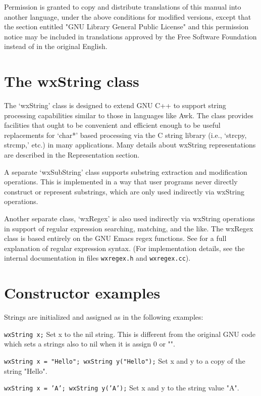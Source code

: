 Permission is granted to copy and distribute translations of this
manual into another language, under the above conditions for modified
versions, except that the section entitled "GNU Library General Public
License" and this permission notice may be included in translations
approved by the Free Software Foundation instead of in the original
English.


\section{The wxString class}

The `wxString' class is designed to extend GNU C++ to support string
processing capabilities similar to those in languages like Awk. The
class provides facilities that ought to be convenient and efficient
enough to be useful replacements for `char*' based processing via the C
string library (i.e., `strcpy, strcmp,' etc.) in many applications.
Many details about wxString representations are described in the
Representation section.

A separate `wxSubString' class supports substring extraction and
modification operations. This is implemented in a way that user
programs never directly construct or represent substrings, which are
only used indirectly via wxString operations.

Another separate class, `wxRegex' is also used indirectly via wxString
operations in support of regular expression searching, matching, and the
like.  The wxRegex class is based entirely on the GNU Emacs regex
functions. See  
for a full explanation of regular expression syntax. (For
implementation details, see the internal documentation in files 
{\tt wxregex.h} and {\tt wxregex.cc}).

\section{Constructor examples}

Strings are initialized and assigned as in the following examples:

{\tt wxString x;} 
Set x to the nil string. This is different from the original GNU code
which sets a strings also to nil when it is assign 0 or "".

{\tt wxString x = "Hello"; wxString y("Hello");} 
Set x and y to a copy of the string "Hello".

{\tt wxString x = 'A'; wxString y('A');} 
Set x and y to the string value "A".

